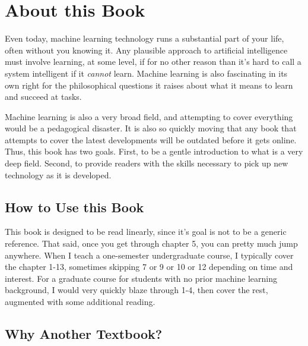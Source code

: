 
\chapter{About this Book} \label{sec:intro}

Even today, machine learning technology runs a substantial part of your life, often without you knowing it.
Any plausible approach to artificial intelligence must involve learning, at some level, if for no other reason than it's hard to call a system intelligent if it \emph{cannot} learn.
Machine learning is also fascinating in its own right for the philosophical questions it raises about what it means to learn and succeed at tasks.

Machine learning is also a very broad field, and attempting to cover everything would be a pedagogical disaster.
It is also so quickly moving that any book that attempts to cover the latest developments will be outdated before it gets online.
Thus, this book has two goals.
First, to be a gentle introduction to what is a very deep field.
Second, to provide readers with the skills necessary to pick up new technology as it is developed.

\section{How to Use this Book}

This book is designed to be read linearly, since it's goal is not to be a generic reference.
That said, once you get through chapter 5, you can pretty much jump anywhere.
When I teach a one-semester undergraduate course, I typically cover the chapter 1-13, sometimes skipping 7 or 9 or 10 or 12 depending on time and interest.
For a graduate course for students with no prior machine learning background, I would very quickly blaze through 1-4, then cover the rest, augmented with some additional reading.


\section{Why Another Textbook?}

